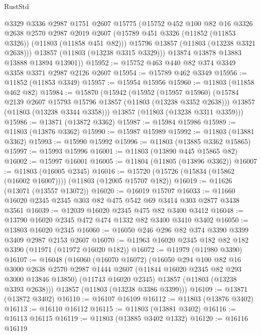 \begin{lexlean}{RustStd}
\begin{coremodule}
          @3329
          @3336
          @2987
          @1751
          @2607
          @15775
          (@15752
            @452
            @100
            @82
            @16
            @3326
            @2638
            @2570
            @2987
            @2019
            @2607
            (@15789 @451 @3326 (@11852 (@11853 @3326)) (@11803 (@11858 @451 @82)))
            @15796
            @13857
            (@11803 (@13238 @3321 @2638)))
          @13857
          (@11803 (@13238 @3315 @3329)))
        @13874
        @13878
        @13883
        @13888
        @13894
        @13901))
@15952 := @15752 @463 @440 @82 @374 @3349 @3358 @3371 @2987 @2126 @2607
@15954 := @15789 @462 @3349
@15956 := @11852 (@11853 @3349)
@15957 := @15954 @15956
@15960 := @11803 (@11858 @462 @82)
@15984 := @15870
    (@15942
      (@15952
        (@15957 @15960)
        (@15784 @2139 @2607 @15793 @15796 @13857 (@11803 (@13238 @3352 @2638)))
        @13857
        (@11803 (@13238 @3344 @3358)))
      @13857
      (@11803 (@13238 @3311 @3359)))
@15986 := @13871 (@13872 @3362)
@15987 := @15984 @15986
@15989 := @11803 (@13876 @3362)
@15990 := @15987 @15989
@15992 := @11803 (@13881 @3362)
@15993 := @15990 @15992
@15996 := @11803 (@13885 @3362 @15865)
@15997 := @15993 @15996
@16001 := @11803 (@13890 @445 @15865 @82)
@16002 := @15997 @16001
@16005 := @11804 (@11805 (@13896 @3362))
@16007 := @11803 (@16005 @2345)
@16016 := @15720 (@15726 (@15834 (@15862 (@16002 @16007)))) (@11803 (@12005 @15707 @182))
@16019 := @11626 (@13071 (@13557 @13072))
@16020 := @16019 @15707
@16033 := @11660 @16020 @2345 @2345 @303 @82 @475 @542 @69 @3414 @303 @2877 @3438 @3561
@16039 := @12039 @16020 @2345 @475 @82 @3400 @3412
@16048 := @13790 @16020 @2345 @472 @474 @1332 @82 @3400 @3410 @3402
@16050 := @13803 @16020 @2345
@16060 := @16050 @246 @296 @82 @374 @3390 @3399 @3409 @2987 @2153 @2607
@16070 := @11963 @16020 @2345 @182 @82 @182 @3390 (@11971 (@11972 @16020 @182))
@16072 := @11979 (@11980 @3390)
@16107 := @16048
    (@16060
      (@16070 @16072)
      (@16050
        @294
        @100
        @82
        @16
        @3000
        @2638
        @2570
        @2987
        @1444
        @2607
        (@11844 @16020 @2345 @82 @293 @3000 @13846 @13850)
        (@11743 @16020 @2345)
        @13857
        (@11803 (@13238 @3393 @2638)))
      @13857
      (@11803 (@13238 @3386 @3399)))
@16109 := @13871 (@13872 @3402)
@16110 := @16107 @16109
@16112 := @11803 (@13876 @3402)
@16113 := @16110 @16112
@16115 := @11803 (@13881 @3402)
@16116 := @16113 @16115
@16119 := @11803 (@13885 @3402 @1332)
@16120 := @16116 @16119

\end{coremodule}
\end{lexlean}
